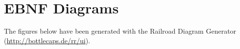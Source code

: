 \section*{EBNF Diagrams}
\label{app:ebnf}

%

The figures below have been generated with the Railroad Diagram Generator (\url{http://bottlecaps.de/rr/ui}).

